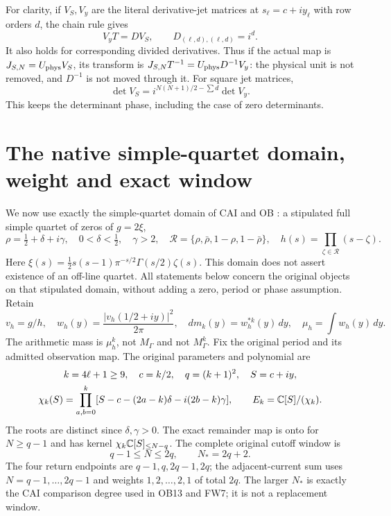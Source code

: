 For clarity, if $V_S,V_y$ are the literal derivative-jet matrices at
$s_\ell=c+iy_\ell$ with row orders $d$, the chain rule gives
\begin{equation}\label{lgamma:eq:jets}
 V_yT=D V_S,\qquad D_{(\ell,d),(\ell,d)}=i^d.
\end{equation}
It also holds for corresponding divided derivatives.  Thus if the
actual map is $J_{S,N}=U_{\rm phys}V_S$, its transform is
$J_{S,N}T^{-1}=U_{\rm phys}D^{-1}V_y$: the physical unit is not removed,
and $D^{-1}$ is not moved through it.  For square jet matrices,
\[
 \det V_S=i^{N(N+1)/2-\sum d}\det V_y.
\]
This keeps the determinant phase, including the case of zero determinants.

\section{The native simple-quartet domain, weight and exact window}

We now use exactly the simple-quartet domain of CAI and OB
\cite{lgamma:CAI,lgamma:OB}: a stipulated full simple quartet of zeros of $g=2\xi$,
\begin{equation}\label{lgamma:eq:nativedomain}
 \rho=\tfrac12+\delta+i\gamma,\quad 0<\delta<\tfrac12,\quad\gamma>2,
 \quad \mathcal R=\{\rho,\bar\rho,1-\rho,1-\bar\rho\},
 \quad h(s)=\prod_{\zeta\in\mathcal R}(s-\zeta).
\end{equation}
Here $\xi(s)=\tfrac12s(s-1)\pi^{-s/2}\Gamma(s/2)\zeta(s)$.
This domain does not assert existence of an off-line quartet.
All statements below concern the original objects on that stipulated
domain, without adding a zero, period or phase assumption.
Retain
\begin{equation}\label{lgamma:eq:nativeweight}
 v_h=g/h,\quad w_h(y)=\frac{|v_h(1/2+iy)|^2}{2\pi},\quad
 dm_k(y)=w_h^{*k}(y)\,dy,\quad
 \mu_h=\int w_h(y)\,dy.
\end{equation}
The arithmetic mass is $\mu_h^k$, not $M_\Gamma$ and not
$M_\Gamma^k$.  Fix the original period and its admitted observation map.
The original parameters and polynomial are
\begin{equation}\label{lgamma:eq:chik}
 \begin{gathered}
 k=4\ell+1\ge9,\quad c=k/2,\quad q=(k+1)^2,\quad S=c+iy,\\
 \chi_k(S)=\prod_{a,b=0}^k
 [S-c-(2a-k)\delta-i(2b-k)\gamma],\qquad E_k=\mathbb C[S]/(\chi_k).
 \end{gathered}
\end{equation}
The roots are distinct since $\delta,\gamma>0$.  The exact remainder map
is onto for $N\ge q-1$ and has kernel $\chi_k\mathbb C[S]_{\le N-q}$.
The complete original cutoff window is
\begin{equation}\label{lgamma:eq:window}
 q-1\le N\le2q,
 \qquad N_*=2q+2.
\end{equation}
The four return endpoints are $q-1,q,2q-1,2q$; the adjacent-current sum
uses $N=q-1,\ldots,2q-1$ and weights $1,2,\ldots,2,1$ of total $2q$.
The larger $N_*$ is exactly the CAI comparison degree used in OB13 and
FW7; it is not a replacement window.

